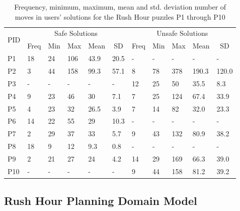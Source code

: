 \documentclass[doctor]{thesis} %
\theoremstyle{plain}
\begin{document}
\begin{table}[htb]
\begin{tabular}{|l|l|l|l|l|l|l|l|l|l|l|}
\hline
\multicolumn{1}{|c|}{\multirow{2}{*}{PID}} &
  \multicolumn{5}{c|}{Safe Solutions} &
  \multicolumn{5}{c|}{Unsafe Solutions} \\ \cline{2-11} 
\multicolumn{1}{|c|}{} &
  \multicolumn{1}{c|}{Freq} &
  \multicolumn{1}{c|}{Min} &
  \multicolumn{1}{c|}{Max} &
  \multicolumn{1}{c|}{Mean} &
  \multicolumn{1}{c|}{SD} &
  \multicolumn{1}{c|}{Freq} &
  \multicolumn{1}{c|}{Min} &
  \multicolumn{1}{c|}{Max} &
  \multicolumn{1}{c|}{Mean} &
  \multicolumn{1}{c|}{SD} \\ \hline
P1  & 18 & 24 & 106 & 43.9  & 20.5  & -  & -  & -   & -    & -    \\ 
P2  &  3  & 44 & 158 & 99.3 & 57.1 & 8  & 78 & 378 & 190.3 & 120.0\\ 
P3  & -  & -  & -   & -     & -     & 12 & 25 & 50  & 35.5 & 8.3  \\ 
P4  & 9  & 23 & 46  & 30    & 7.1   & 7  & 25 & 124 & 67.4 & 33.9 \\ 
P5  & 4  & 23 & 32  & 26.5  & 3.9   & 7  & 14 & 82  & 32.0 & 23.3 \\
P6  & 14 & 22 & 55  & 29    & 10.3  & -  & -  & -   & -    & -    \\
P7  & 2  & 29 & 37  & 33    & 5.7   & 9  & 43 & 132 & 80.9 & 38.2 \\ 
P8  & 18 & 9  & 12  & 9.3   & 0.8   & -  & -  & -   & -    & -    \\
P9  & 2  & 21 & 27  & 24    & 4.2   & 14 & 29 & 169 & 66.3 & 39.0 \\
P10 & -  & -  & -   & -     & -     & 9  & 44 & 158 & 81.2 & 39.2 \\ \hline
\end{tabular}
\caption{Frequency, minimum, maximum, mean and std. deviation number of moves in users' solutions for the Rush Hour puzzles P1 through P10}
\label{tab:usersolutions}
\end{table}



\subsection*{Rush Hour Planning Domain Model}
\end{document}
